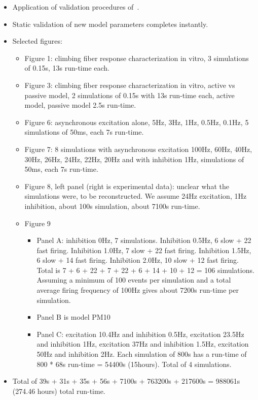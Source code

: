 \documentclass[12pt]{article}
\begin{document}
\begin{itemize}
\begin{itemize}
  \item Application of validation procedures
    of~\cite{De-Schutter-E:1994vn}.
  \item Static validation of new model parameters completes instantly.
  \item Selected figures:
    \begin{itemize}
    \item Figure 1: climbing fiber response characterization in vitro,
      3 simulations of 0.15s, 13s run-time each.
    \item Figure 3: climbing fiber response characterization in vitro,
      active vs passive model, 2 simulations of 0.15s with 13s
      run-time each, active model, passive model 2.5s run-time.
    \item Figure 6: asynchronous excitation alone, 5Hz, 3Hz, 1Hz, 0.5Hz,
      0.1Hz, 5 simulations of 50ms, each 7s run-time.
    \item Figure 7: 8 simulations with asynchronous excitation 100Hz,
      60Hz, 40Hz, 30Hz, 26Hz, 24Hz, 22Hz, 20Hz and with inhibition
      1Hz, simulations of 50ms, each 7s run-time.
    \item Figure 8, left panel (right is experimental data): unclear
      what the simulations were, to be reconstructed.  We assume 24Hz
      excitation, 1Hz inhibition, about 100s simulation, about 7100s
      run-time.
    \item Figure 9
      \begin{itemize}
      \item Panel A: inhibition 0Hz, 7 simulations.  Inhibition 0.5Hz,
        6 slow + 22 fast firing.  Inhibition 1.0Hz, 7 slow + 22 fast
        firing.  Inhibition 1.5Hz, 6 slow + 14 fast firing.
        Inhibition 2.0Hz, 10 slow + 12 fast firing.  Total is 7 + 6 +
        22 + 7 + 22 + 6 + 14 + 10 + 12 = 106 simulations.  Assuming a
        minimum of 100 events per simulation and a total average
        firing frequency of 100Hz gives about 7200s run-time per
        simulation.
      \item Panel B is model PM10
      \item Panel C: excitation 10.4Hz and inhibition 0.5Hz,
        excitation 23.5Hz and inhibition 1Hz, excitation 37Hz and
        inhibition 1.5Hz, excitation 50Hz and inhibition 2Hz.  Each
        simulation of 800s has a run-time of 800 * 68s run-time =
        54400s (15hours).  Total of 4 simulations.
      \end{itemize}
    \end{itemize}
  \item Total of 39s + 31s + 35s + 56s + 7100s + 763200s + 217600s =
    988061s (274.46 hours) total run-time.



\end{itemize}
\end{itemize}
\end{document}
